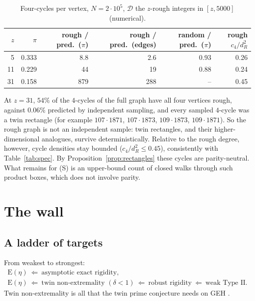 \documentclass[11pt]{amsart}
\theoremstyle{definition}
\theoremstyle{remark}
\newcommand{\cD}{\mathcal D}
\newcommand{\EE}{\mathrm E}
\begin{document}
\begin{table}[h]
\centering\small
\begin{tabular}{rrrrrr}
\toprule
$z$ & $\pi$ & rough / pred.\ ($\pi$) & rough / pred.\ (edges) & random / pred.\ ($\pi$) & rough $c_4/d_R^2$\\
\midrule
5 & 0.333 & 8.8 & 2.6 & 0.93 & 0.26\\
11 & 0.229 & 44 & 19 & 0.88 & 0.24\\
31 & 0.158 & 879 & 288 & -- & 0.45\\
\bottomrule
\end{tabular}
\caption{Four-cycles per vertex, $N=2\cdot10^5$, $\cD$ the $z$-rough integers in $[z,5000]$ (numerical).}\label{tab:cycles}
\end{table}

At $z=31$, $54\%$ of the $4$-cycles of the full graph have all four vertices rough, against $0.06\%$ predicted by independent sampling, and every sampled $4$-cycle was a twin rectangle (for example $107\cdot1871$, $107\cdot1873$, $109\cdot1873$, $109\cdot1871$). So the rough graph is not an independent sample: twin rectangles, and their higher-dimensional analogues, survive deterministically. Relative to the rough degree, however, cycle densities stay bounded ($c_4/d_R^2\le0.45$), consistently with Table~\ref{tab:spec}. By Proposition~\ref{prop:rectangles} these cycles are parity-neutral. What remains for (S) is an upper-bound count of closed walks through such product boxes, which does not involve parity.

\section{The wall}\label{sec:wall}

\subsection{A ladder of targets}
From weakest to strongest:
\begin{gather*}
\EE(\eta)\ \Leftarrow\ \text{asymptotic exact rigidity},\\
\EE(\eta)\ \Leftarrow\ \text{twin non-extremality }(\delta<1)\ \Leftarrow\ \text{robust rigidity}\ \Leftarrow\ \text{weak Type II}.
\end{gather*}
Twin non-extremality is all that the twin prime conjecture needs on GEH \cite{Wan26b}.
\end{document}
